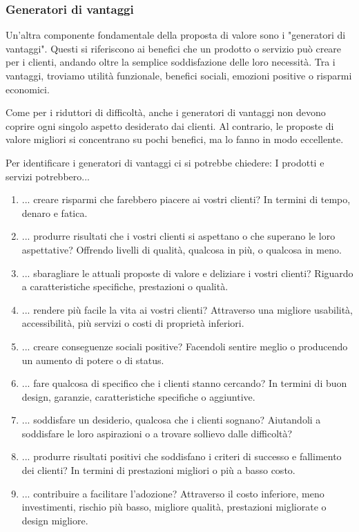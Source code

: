 \subsubsection{Generatori di vantaggi}
Un’altra componente fondamentale della proposta di valore sono i "generatori di vantaggi". Questi si riferiscono ai benefici che un prodotto o servizio può creare per i clienti, andando oltre la semplice soddisfazione delle loro necessità. Tra i vantaggi, troviamo utilità funzionale, benefici sociali, emozioni positive o risparmi economici.

Come per i riduttori di difficoltà, anche i generatori di vantaggi non devono coprire ogni singolo aspetto desiderato dai clienti. Al contrario, le proposte di valore migliori si concentrano su pochi benefici, ma lo fanno in modo eccellente.

Per identificare i generatori di vantaggi ci si potrebbe chiedere: I prodotti e servizi potrebbero...
\begin{enumerate}
    \item ... creare risparmi che farebbero piacere ai vostri clienti? In termini di tempo, denaro e fatica.
    \item ... produrre risultati che i vostri clienti si aspettano o che superano le loro aspettative? Offrendo livelli di qualità, qualcosa in più, o qualcosa in meno.
    \item ... sbaragliare le attuali proposte di valore e deliziare i vostri clienti? Riguardo a caratteristiche specifiche, prestazioni o qualità.
    \item ... rendere più facile la vita ai vostri clienti? Attraverso una migliore usabilità, accessibilità, più servizi o costi di proprietà inferiori.
    \item ... creare conseguenze sociali positive? Facendoli sentire meglio o producendo un aumento di potere o di status.
    \item ... fare qualcosa di specifico che i clienti stanno cercando? In termini di buon design, garanzie, caratteristiche specifiche o aggiuntive.
    \item ... soddisfare un desiderio, qualcosa che i clienti sognano? Aiutandoli a soddisfare le loro aspirazioni o a trovare sollievo dalle difficoltà?
    \item ... produrre risultati positivi che soddisfano i criteri di successo e fallimento dei clienti? In termini di prestazioni migliori o più a basso costo.
    \item ... contribuire a facilitare l'adozione? Attraverso il costo inferiore, meno investimenti, rischio più basso, migliore qualità, prestazioni migliorate o design migliore.
\end{enumerate}

